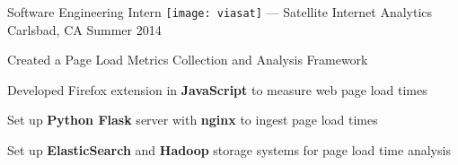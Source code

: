 \begin{cventries}
\vspace{\myspacing}


\cventry
{Software Engineering Intern} %
{{\texttt{[image: viasat]}} --- Satellite Internet Analytics} %
{Carlsbad, CA} %
{Summer 2014} %
{%
  \begin{cvitems}
    \item {Created a Page Load Metrics Collection and Analysis Framework}
    \item {Developed Firefox extension in \textbf{JavaScript} to measure web page load times}
    \item {Set up \textbf{Python Flask} server with \textbf{nginx} to ingest page load times}
    \item {Set up \textbf{ElasticSearch} and \textbf{Hadoop} storage systems for page load time analysis}
  \end{cvitems}
}


\end{cventries}
